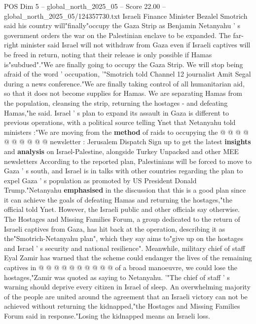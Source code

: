 \begin{textsample}{POS Dim 5 – global\_north\_2025\_05 – Score 22.00 – global\_north\_2025\_05/124357730.txt}  \label{ex:f5_pos_072}
Israeli Finance Minister Bezalel Smotrich said his country will"finally"occupy the Gaza Strip as Benjamin Netanyahu ' s government orders the war on the Palestinian enclave to be expanded.
The far-right minister said Israel will not withdraw from Gaza even if Israeli captives will be freed in return, noting that their release is only possible if Hamas is"subdued"."We are finally going to occupy the Gaza Strip.
We will stop being afraid of the word ' occupation, '"Smotrich told Channel 12 journalist Amit Segal during a news conference."We are finally taking control of all humanitarian aid, so that it does not become supplies for Hamas.
We are separating Hamas from the population, cleansing the strip, returning the hostages - and defeating Hamas,"he said.
Israel ' s plan to expand its assault in Gaza is different to previous operations, with a political source telling Ynet that Netanyahu told ministers :"We are moving from the \textbf{method} of raids to occupying the @ @ @ @ @ @ @ @ @ @ newsletter : Jerusalem Dispatch Sign up to get the latest \textbf{insights} and \textbf{analysis} on Israel-Palestine, alongside Turkey Unpacked and other MEE newsletters According to the reported plan, Palestinians will be forced to move to Gaza ' s south, and Israel is in talks with other countries regarding the plan to expel Gaza ' s population as promoted by US President Donald Trump."Netanyahu \textbf{emphasised} in the discussion that this is a good plan since it can achieve the goals of defeating Hamas and returning the hostages,"the official told Ynet.
However, the Israeli public and other officials say otherwise.
The Hostages and Missing Families Forum, a group dedicated to the return of Israeli captives from Gaza, has hit back at the operation, describing it as the"Smotrich-Netanyahu plan", which they say aims to"give up on the hostages and Israel ' s security and national resilience".
Meanwhile, military chief of staff Eyal Zamir has warned that the scheme could endanger the lives of the remaining captives in @ @ @ @ @ @ @ @ @ @ of a broad manoeuvre, we could lose the hostages,"Zamir was quoted as saying to Netanyahu. '"The chief of staff ' s warning should deprive every citizen in Israel of sleep.
An overwhelming majority of the people are united around the agreement that an Israeli victory can not be achieved without returning the kidnapped,"the Hostages and Missing Families Forum said in response."Losing the kidnapped means an Israeli loss.

\end{textsample}
